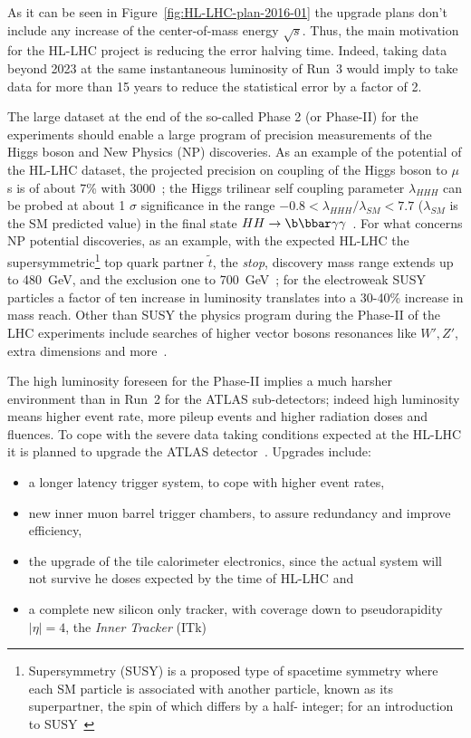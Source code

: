As it can be seen in Figure~\ref{fig:HL-LHC-plan-2016-01} the upgrade plans don't include any increase 
of the center-of-mass energy $\sqrt{s}$. Thus, the main motivation for the HL-LHC project is 
reducing the error halving time. Indeed, taking data beyond 2023 at the same instantaneous luminosity of 
Run~3 would imply  to take data for more than 15 years to reduce the statistical error by a factor of 2.

The large dataset at the end of the so-called Phase 2 (or {\it} Phase-II) for the experiments should enable 
a  large program of precision measurements of the Higgs boson and New Physics (NP) discoveries. 
As an example of the potential of the HL-LHC dataset, the projected precision on coupling of the Higgs
 boson to $\mu$s is of about 7\% with  3000~\invfb; the Higgs 
trilinear self coupling parameter $\lambda_{HHH}$ can be probed at about 1 $\sigma$ significance 
in the range $-0.8<\lambda_{HHH}/\lambda_{SM}<7.7$ ($\lambda_{SM}$ is the SM predicted value) 
in the final state $HH\to\b\bbar\gamma\gamma$~\cite{ATL-PHYS-PUB-2014-016}. 
For what concerns NP potential discoveries, as an example, with the expected HL-LHC the 
supersymmetric\footnote{Supersymmetry (SUSY) is a proposed type of spacetime symmetry where  each 
SM particle is associated with another particle, known as its superpartner, the spin of which differs by a half-
integer; for an introduction to SUSY~\cite{SusyPrimer}} top quark partner $\widetilde{t}$, 
the {\it stop}, discovery mass range extends up to 480~GeV, and the exclusion one to 700~GeV~\cite{ATL-PHYS-PUB-2016-022};
for the electroweak SUSY particles a factor of ten increase in luminosity translates into a 30-40\% increase in mass reach. Other than SUSY the physics program 
during the Phase-II of the LHC experiments include searches of higher  vector bosons resonances like 
$W',Z'$, 
extra dimensions and more~\cite{ATLASLoIPhaseII}.

The high luminosity foreseen for the Phase-II implies a much harsher environment than in Run~2 
for the ATLAS sub-detectors; indeed high luminosity means higher event rate, more pileup events 
and higher radiation doses and fluences. 
To cope with the severe data taking conditions expected at the HL-LHC it is planned to 
upgrade the  ATLAS detector~\cite{ATLASLoIPhaseII,ATLASITkScopingDocument}. Upgrades include:

\begin{itemize}
\item a longer latency trigger system, to cope with higher event rates,
\item new inner muon barrel trigger chambers, to assure redundancy and improve efficiency,
\item the upgrade of the tile calorimeter electronics, since the actual system will not survive he doses expected by the time of HL-LHC and
\item a complete new silicon only tracker, with coverage down to pseudorapidity $|\eta|=4$, the {\it Inner Tracker} (ITk)
\end{itemize} 

